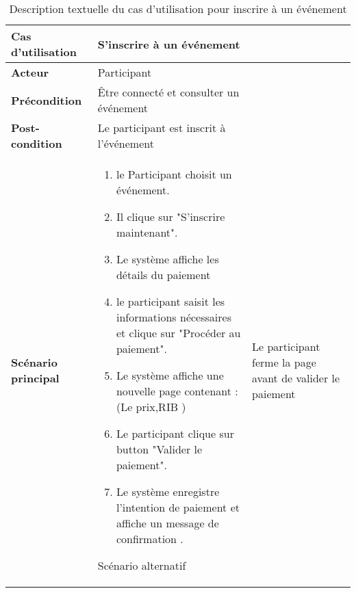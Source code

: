 \begin{longtable}{|>{\bfseries}p{4cm}|p{10cm}|}
\hline
Cas d’utilisation & S'inscrire à un événement \\
\hline
Acteur & Participant \\
\hline
Précondition & Être connecté et consulter un événement\\
\hline
Post-condition & Le participant est inscrit à l’événement \\
\hline
Scénario principal & 
\begin{enumerate}
  \item le Participant choisit un événement.
  \item   Il clique sur "S'inscrire maintenant".
  \item Le système affiche les détails du paiement 
  \item le participant  saisit les informations nécessaires et clique sur  "Procéder au paiement".
\item Le système affiche une nouvelle page contenant :(Le prix,RIB )
\item Le participant clique sur button "Valider le paiement".
\item Le système enregistre l’intention de paiement et affiche un message de confirmation .

\end{enumerate} 
\hline
Scénario alternatif &  Le participant ferme la page avant de valider le paiement

\hline
\caption{Description textuelle du cas d’utilisation pour inscrire à un événement}
\end{longtable}
\clearpage
